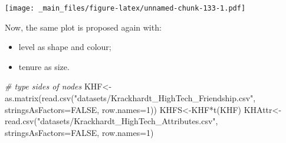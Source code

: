 \documentclass[
  notitlepage,
  onecolumn,
  openany]{book}
\newenvironment{Shaded}{\begin{snugshade}}{\end{snugshade}}
\newcommand{\AttributeTok}[1]{\textcolor[rgb]{0.77,0.63,0.00}{#1}}
\newcommand{\CommentTok}[1]{\textcolor[rgb]{0.56,0.35,0.01}{\textit{#1}}}
\newcommand{\ConstantTok}[1]{\textcolor[rgb]{0.00,0.00,0.00}{#1}}
\newcommand{\DecValTok}[1]{\textcolor[rgb]{0.00,0.00,0.81}{#1}}
\newcommand{\FunctionTok}[1]{\textcolor[rgb]{0.00,0.00,0.00}{#1}}
\newcommand{\NormalTok}[1]{#1}
\newcommand{\OtherTok}[1]{\textcolor[rgb]{0.56,0.35,0.01}{#1}}
\newcommand{\SpecialCharTok}[1]{\textcolor[rgb]{0.00,0.00,0.00}{#1}}
\newcommand{\StringTok}[1]{\textcolor[rgb]{0.31,0.60,0.02}{#1}}
\providecommand{\tightlist}{%
  \setlength{\itemsep}{0pt}\setlength{\parskip}{0pt}}
\begin{document}
\texttt{[image: \_main\_files/figure-latex/unnamed-chunk-133-1.pdf]}

Now, the same plot is proposed again with:

\begin{itemize}
\tightlist
\item
  level as shape and colour;
\item
  tenure as size.
\end{itemize}

\begin{Shaded}
\begin{Highlighting}[]
\CommentTok{\# type sides of nodes}
\NormalTok{KHF}\OtherTok{\textless{}{-}}\FunctionTok{as.matrix}\NormalTok{(}\FunctionTok{read.csv}\NormalTok{(}\StringTok{"datasets/Krackhardt\_HighTech\_Friendship.csv"}\NormalTok{,}
                        \AttributeTok{stringsAsFactors=}\ConstantTok{FALSE}\NormalTok{, }\AttributeTok{row.names=}\DecValTok{1}\NormalTok{))}
\NormalTok{KHFS}\OtherTok{\textless{}{-}}\NormalTok{KHF}\SpecialCharTok{*}\FunctionTok{t}\NormalTok{(KHF)}
\NormalTok{KHAttr}\OtherTok{\textless{}{-}}\FunctionTok{read.csv}\NormalTok{(}\StringTok{"datasets/Krackhardt\_HighTech\_Attributes.csv"}\NormalTok{,}
                 \AttributeTok{stringsAsFactors=}\ConstantTok{FALSE}\NormalTok{, }\AttributeTok{row.names=}\DecValTok{1}\NormalTok{)}


\end{Highlighting}
\end{Shaded}
\end{document}
